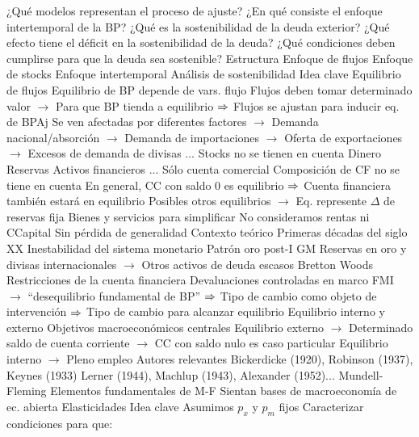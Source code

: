 \documentclass{nuevotema}
\begin{document}
\begin{esquemal}
			\3 ¿Qué modelos representan el proceso de ajuste?
			\3 ¿En qué consiste el enfoque intertemporal de la BP?
			\3 ¿Qué es la sostenibilidad de la deuda exterior?
			\3 ¿Qué efecto tiene el déficit en la sostenibilidad de la deuda?
			\3 ¿Qué condiciones deben cumplirse para que la deuda sea sostenible?
		\2 Estructura
			\3 Enfoque de flujos
			\3 Enfoque de stocks
			\3 Enfoque intertemporal
			\3 Análisis de sostenibilidad
	\1 
		\2 Idea clave
			\3 Equilibrio de flujos
				\4 Equilibrio de BP depende de vars. flujo
				\4[] Flujos deben tomar determinado valor
				\4[] $\to$ Para que BP tienda a equilibrio
				\4[] $\Rightarrow$ Flujos se ajustan para inducir eq. de BPAj
				\4[] Se ven afectadas por diferentes factores
				\4[] $\to$ Demanda nacional/absorción
				\4[] $\to$ Demanda de importaciones
				\4[] $\to$ Oferta de exportaciones
				\4[] $\to$ Excesos de demanda de divisas
				\4[] ...
				\4 Stocks no se tienen en cuenta
				\4[] Dinero
				\4[] Reservas
				\4[] Activos financieros
				\4[] ...
			\3 Sólo cuenta comercial
				\4 Composición de CF no se tiene en cuenta
				\4 En general, CC con saldo 0 es equilibrio
				\4[] $\Rightarrow$ Cuenta financiera también estará en equilibrio
				\4[] Posibles otros equilibrios
				\4[] $\to$ Eq. represente $\Delta$ de reservas fija
				\4 Bienes y servicios para simplificar
				\4[] No consideramos rentas ni CCapital
				\4[] Sin pérdida de generalidad
			\3 Contexto teórico
				\4 Primeras décadas del siglo XX
				\4[] Inestabilidad del sistema monetario
				\4[] Patrón oro post-I GM
				\4[] Reservas en oro y divisas internacionales
				\4[] $\to$ Otros activos de deuda escasos
				\4 Bretton Woods
				\4[] Restricciones de la cuenta financiera
				\4[] Devaluaciones controladas en marco FMI
				\4[] $\to$ ``desequilibrio fundamental de BP''
				\4[] $\Rightarrow$ Tipo de cambio como objeto de intervención
				\4[] $\Rightarrow$ Tipo de cambio para alcanzar equilibrio
				\4 Equilibrio interno y externo
				\4[] Objetivos macroeconómicos centrales
				\4[] Equilibrio externo
				\4[] $\to$ Determinado saldo de cuenta corriente
				\4[] $\to$ CC con saldo nulo es caso particular
				\4[] Equilibrio interno
				\4[] $\to$ Pleno empleo
				\4 Autores relevantes
				\4[] Bickerdicke (1920), Robinson (1937), Keynes (1933)
				\4[] Lerner (1944), Machlup (1943), Alexander (1952)...
				\4 Mundell-Fleming
				\4[] Elementos fundamentales de M-F
				\4[] Sientan bases de macroeconomía de ec. abierta
		\2 Elasticidades
			\3 Idea clave
				\4 Asumimos $p_x$ y $p_m$ fijos
				\4 Caracterizar condiciones para que:

\end{esquemal}
\end{document}
